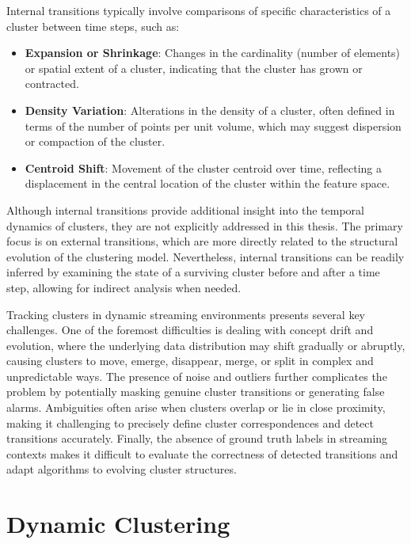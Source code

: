 Internal transitions typically involve comparisons of specific characteristics
of a cluster between time steps, such as:

\begin{itemize}
    \item \textbf{Expansion or Shrinkage}: Changes in the cardinality (number of
          elements) or spatial extent of a cluster, indicating that the cluster has
          grown or contracted.
    \item \textbf{Density Variation}: Alterations in the density of a cluster,
          often defined in terms of the number of points per unit volume, which may
          suggest dispersion or compaction of the cluster.
    \item \textbf{Centroid Shift}: Movement of the cluster centroid over time,
          reflecting a displacement in the central location of the cluster within the
          feature space.
\end{itemize}

Although internal transitions provide additional insight into the temporal
dynamics of clusters, they are not explicitly addressed in this thesis. The
primary focus is on external transitions, which are more directly related to
the structural evolution of the clustering model. Nevertheless, internal
transitions can be readily inferred by examining the state of a surviving
cluster before and after a time step, allowing for indirect analysis when
needed.

Tracking clusters in dynamic streaming environments presents several key
challenges. One of the foremost difficulties is dealing with concept drift and
evolution, where the underlying data distribution may shift gradually or
abruptly, causing clusters to move, emerge, disappear, merge, or split in
complex and unpredictable ways. The presence of noise and outliers further
complicates the problem by potentially masking genuine cluster transitions or
generating false alarms. Ambiguities often arise when clusters overlap or lie
in close proximity, making it challenging to precisely define cluster
correspondences and detect transitions accurately. Finally, the absence of
ground truth labels in streaming contexts makes it difficult to evaluate the
correctness of detected transitions and adapt algorithms to evolving cluster
structures.

\section{Dynamic Clustering}\label{sec:dynamic_clustering}

